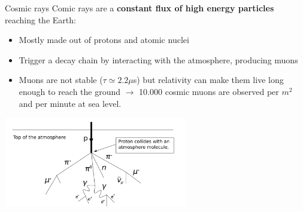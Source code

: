 \documentclass[8 pt]{beamer}
\begin{document}
\begin{frame}{Cosmic rays}
\justifying
Comic rays are a \textbf{constant flux of high energy particles} reaching the Earth:
\begin{itemize}
	\justifying
	\item Mostly made out of protons and atomic nuclei
	\item Trigger a decay chain by interacting with the atmosphere, producing muons
	\item Muons are not stable ($\tau \simeq 2.2\mu$s) but relativity can make them live long enough to reach the ground $\rightarrow$ 10.000 cosmic muons are observed per $m^2$ and per minute at sea level.
\end{itemize} \vfill

\begin{minipage}[c]{.98\textwidth}
	\begin{center}
	\includegraphics[width=8cm, height=4cm]{figs/cosmic.png}
	\end{center}
\end{minipage} \hfill \vfill
\end{frame}
\end{document}

